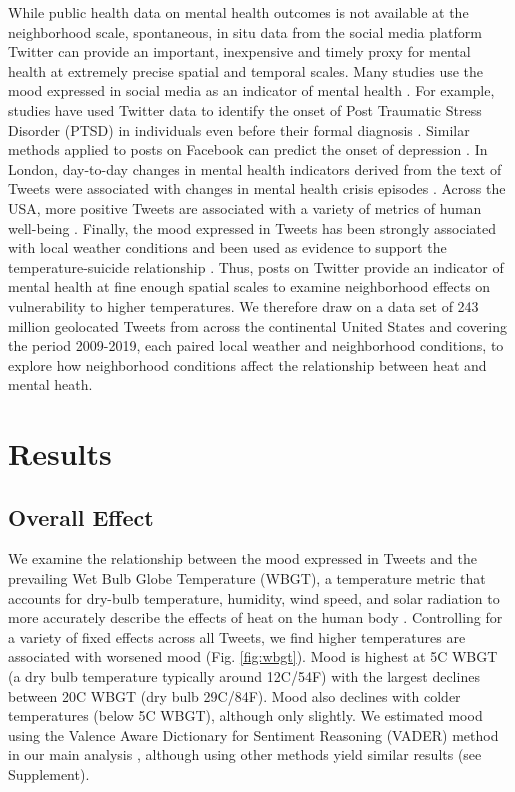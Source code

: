 \documentclass[fleqn,10pt]{wlscirep}
\begin{document}
While public health data on mental health outcomes is not available at the neighborhood scale, spontaneous, in situ data from the social media platform Twitter can provide an important, inexpensive and timely proxy for mental health at extremely precise spatial and temporal scales. Many studies use the mood expressed in social media as an indicator of mental health \cite{Edo-Osagie2020Jul, Sinnenberg2016Dec}. For example, studies have used Twitter data to identify the onset of Post Traumatic Stress Disorder (PTSD) in individuals even before their formal diagnosis \cite{Reece2017Oct}. Similar methods applied to posts on Facebook can predict the onset of depression \cite{Eichstaedt2018Oct}. In London, day-to-day changes in mental health indicators derived from the text of Tweets were associated with changes in mental health crisis episodes \cite{Kolliakou2020Feb}. Across the USA, more positive Tweets are associated with a variety of metrics of human well-being \cite{Mitchell2013May}. Finally, the mood expressed in Tweets has been strongly associated with local weather conditions \cite{baylis_weather_2018, hannak_tweetin_2012} and been used as evidence to support the temperature-suicide relationship \cite{Burke2018Aug}. Thus, posts on Twitter provide an indicator of mental health at fine enough spatial scales to examine neighborhood effects on vulnerability to higher temperatures. We therefore draw on a data set of 243 million geolocated Tweets from across the continental United States and covering the period 2009-2019, each paired local weather and neighborhood conditions, to explore how neighborhood conditions affect the relationship between heat and mental heath.

\section*{Results}

\subsection*{Overall Effect}
We examine the relationship between the mood expressed in Tweets and the prevailing Wet Bulb Globe Temperature (WBGT), a temperature metric that accounts for dry-bulb temperature, humidity, wind speed, and solar radiation to more accurately describe the effects of heat on the human body \cite{budd2008wet}. Controlling for a variety of fixed effects across all Tweets, we find higher temperatures are associated with worsened mood (Fig. \ref{fig:wbgt}).  Mood is highest at 5\textdegree C WBGT (a dry bulb temperature typically around 12\textdegree C/54\textdegree F) with the largest declines between 20\textdegree C WBGT (dry bulb 29\textdegree C/84\textdegree F). Mood also declines with colder temperatures (below 5\textdegree C WBGT), although only slightly. We estimated mood using the Valence Aware Dictionary for Sentiment Reasoning (VADER) method in our main analysis \cite{gilbert_vader_2014}, although using other methods yield similar results (see Supplement).
\end{document}
